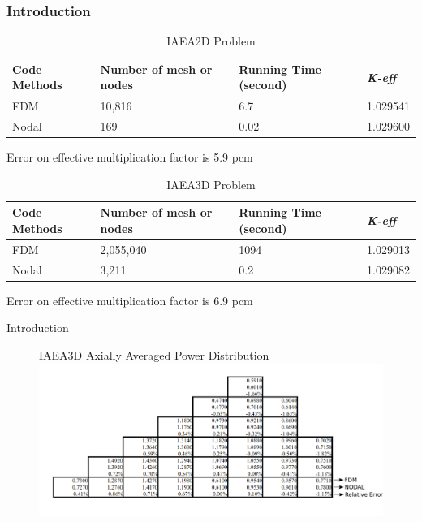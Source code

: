 \documentclass{beamer}
\begin{document}

\begin{frame}
\frametitle{Introduction}
\begin{table}{}
  \caption{IAEA2D Problem}
  \begin{tabular}{p{2cm}p{3cm}p{2.5cm}p{2cm}}
  \toprule
  \textbf{Code Methods} & \textbf{Number of mesh or nodes} & \textbf{Running Time (second)} & \textbf{\emph{K-eff}}\\
  \midrule
  FDM & 10,816 & 6.7 & 1.029541  \\
  Nodal & 169 & 0.02 & 1.029600  \\
  \bottomrule
  \end{tabular}
  \medskip
  \raggedright{Error on effective multiplication factor is 5.9 pcm}
\end{table}

\begin{table}{}
\caption{IAEA3D Problem}
\begin{tabular}{p{2cm}p{3cm}p{2.5cm}p{2cm}}
  \toprule
  \textbf{Code Methods} & \textbf{Number of mesh or nodes} & \textbf{Running Time (second)} & \textbf{\emph{K-eff}}\\
  \midrule
  FDM & 2,055,040 & 1094 & 1.029013 \\
  Nodal & 3,211 & 0.2 & 1.029082  \\
  \bottomrule
  \end{tabular}
  \medskip
  \raggedright{Error on effective multiplication factor is 6.9 pcm}
\end{table}

\end{frame}


\begin{frame}{Introduction}
  \begin{figure}{IAEA3D Axially Averaged Power Distribution}
  \includegraphics[width=1.0\linewidth]{power.png}
  \end{figure}
\end{frame}
\end{document}
